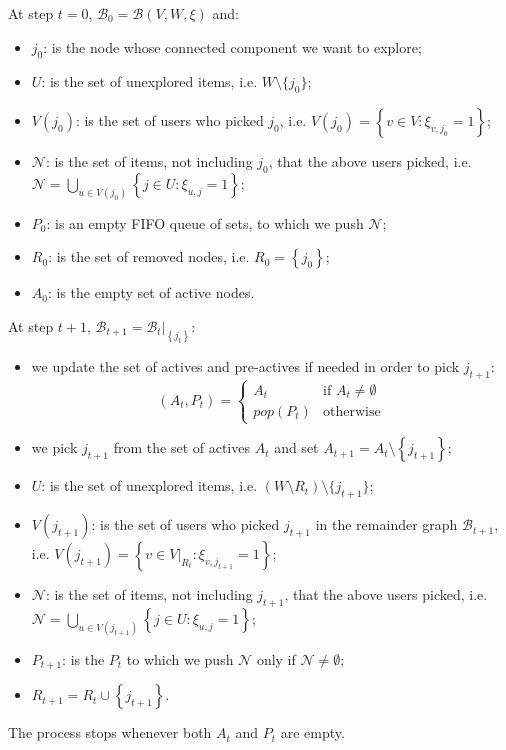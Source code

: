 \begin{defn}\label{defn:gep}
    At step $t=0$, $\mathcal{B}_0=\mathcal{B}(V,W,\xi)$ and:
    \begin{itemize}
        \item $j_0$: is the node whose connected component we want to explore;
        \item $U$: is the set of unexplored items, i.e. $W\setminus \{j_0\}$;
        \item $V(j_0)$: is the set of users who picked $j_0$, i.e. $\displaystyle V(j_0) = \left\{ v \in V \colon \xi_{v,j_0}=1 \right\}$;
        \item $\mathcal{N}$: is the set of items, not including $j_0$, that the above users picked, i.e. $\mathcal{N} = \displaystyle \bigcup_{u \in V(j_0)} \left\{ j \in U \colon \xi_{u,j}=1 \right\}$;
        \item $P_0$: is an empty FIFO queue of sets, to which we push $\mathcal{N}$;
        \item $R_0$: is the set of removed nodes, i.e. $R_0 = \left\{ j_0 \right\}$;
        \item $A_0$: is the empty set of active nodes.
    \end{itemize}
    At step $t+1$, $\displaystyle \mathcal{B}_{t+1} = \mathcal{B}_t|_{\left\{ j_t \right\}}$:
    \begin{itemize}
        \item we update the set of actives and pre-actives if needed in order to pick $j_{t+1}$: \[\left( A_t, P_t \right) = \left\{ \begin{array}{cc} A_t & \textrm{if } A_t \neq \emptyset\\ pop(P_t) & \textrm{otherwise} \end{array} \right.\]
        \item we pick $j_{t+1}$ from the set of actives $A_{t}$ and set $A_{t+1} = A_t \setminus \left\{ j_{t+1} \right\}$;
        \item $U$: is the set of unexplored items, i.e. $(W\setminus R_t)\setminus \{j_{t+1}\}$;
        \item $V(j_{t+1})$: is the set of users who picked $j_{t+1}$ in the remainder graph $\mathcal{B}_{t+1}$, i.e. $\displaystyle V(j_{t+1}) = \left\{ v \in V|_{R_t} \colon \xi_{v,j_{t+1}}=1 \right\}$;
        \item $\mathcal{N}$: is the set of items, not including $j_{t+1}$, that the above users picked, i.e. $\mathcal{N} = \displaystyle \bigcup_{u \in V(j_{t+1})} \left\{ j \in U \colon \xi_{u,j}=1 \right\}$;
        \item $P_{t+1}$: is the $P_t$ to which we push $\mathcal{N}$ only if $\mathcal{N} \neq \emptyset$;
        \item $R_{t+1} = R_t \cup \left\{ j_{t+1} \right\}$.
     \end{itemize}
    The process stops whenever both $A_t$ and $P_t$ are empty.
\end{defn}
